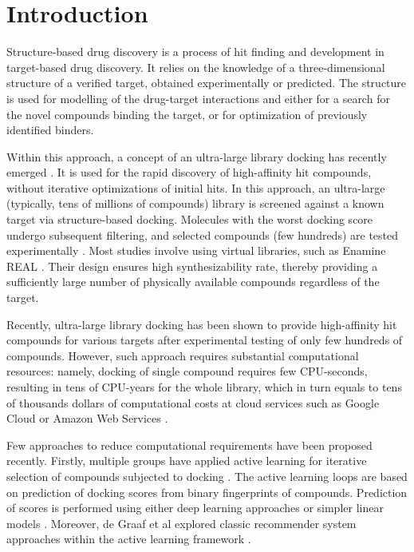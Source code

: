 \section{Introduction}

Structure-based drug discovery is a process of hit finding and development in target-based drug discovery. It relies on the knowledge of a three-dimensional structure of a verified target, obtained experimentally or predicted. The structure is used for modelling of the drug-target interactions and either for a search for the novel compounds binding the target, or for optimization of previously identified binders.

Within this approach, a concept of an ultra-large library docking has recently emerged \cite{Cavasotto2023}. It is used for the rapid discovery of high-affinity hit compounds, without iterative optimizations of initial hits. In this approach, an ultra-large (typically, tens of millions of compounds) library is screened against a known target via structure-based docking. Molecules with the worst docking score undergo subsequent filtering, and selected compounds (few hundreds) are tested experimentally \cite{bender_practical_2021}. Most studies involve using virtual libraries, such as Enamine REAL \cite{noauthor_real_nodate}. Their design ensures high synthesizability rate, thereby providing a sufficiently large number of physically available compounds regardless of the target.

Recently, ultra-large library docking has been shown to provide high-affinity hit compounds for various targets \cite{sigma2_paper, melatonin_paper, ultralarge_docking_first, gorgulla_open-source_2020, beroza_chemical_2022, noauthor_large_nodate, lu_structure-guided_2021, sadybekov_synthon-based_2022, sadybekov_structure-based_2020} after experimental testing of only few hundreds of compounds. However, such approach requires substantial computational resources: namely, docking of single compound requires few CPU-seconds, resulting in tens of CPU-years for the whole library, which in turn equals to tens of thousands dollars of computational costs at cloud services such as Google Cloud or Amazon Web Services \cite{irwin_large_2023,grebner_virtual_2020}.

Few approaches to reduce computational requirements have been proposed recently. Firstly, multiple groups have applied active learning for iterative selection of compounds subjected to docking \cite{Graff2021AcceleratingLearning,autoencoders_guided_learning,logistic_regression,deepdocking,leandocking,Yang2021_shoichet_active_learning}. The active learning loops are based on prediction of docking scores from binary fingerprints of compounds. Prediction of scores is performed using either deep learning approaches \cite{deepdocking,Yang2021_shoichet_active_learning,autoencoders_guided_learning, Graff2021AcceleratingLearning} or simpler linear models \cite{leandocking,logistic_regression}. Moreover, de Graaf et al explored classic recommender system approaches within the active learning framework \cite{Graff2021AcceleratingLearning}. 

